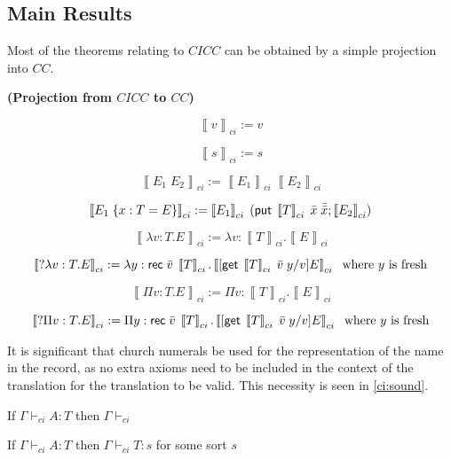 \subsection{Main Results}

Most of the theorems relating to $CICC$ can be obtained by a simple projection into $CC$.

\newcommand{\CICCproj}[1]{ \left\llbracket #1 \right\rrbracket_{ci}}

\begin{definition}
\textbf{ (Projection from $CICC$ to $CC$) }

\[
\CICCproj{v} := v
\]

\[
\CICCproj{s} := s
\]

\[
\CICCproj{E_1 \; E_2} := \CICCproj{E_1} \; \CICCproj{E_2}
\]

\[
\CICCproj{E_1 \; \{ x : T = E \}} := \CICCproj{E_1} \; (\m{put}\;\CICCproj{T}\;\bar{x}\; \bar{\bar{x}}; \CICCproj{E_2} )
\]

\[
\CICCproj{\lambda v : T . E } := \lambda v : \CICCproj{T} . \CICCproj{E}
\]

\[
\CICCproj{?\lambda v : T . E } := \lambda y : \m{rec}\;\bar{v}\; \CICCproj{T} . \CICCproj{ [ \m{get}\; \CICCproj{T}\; \bar{v}\; y  / v ] E}
\;\text{ where $y$ is fresh}
\] 

\[
\CICCproj{\Pi v : T . E } := \Pi v : \CICCproj{T} . \CICCproj{E}
\]

\[
\CICCproj{?\Pi v : T . E } := \Pi y : \m{rec}\;\bar{v}\;\CICCproj{T} . \CICCproj{ [ \m{get}\;\CICCproj{T}\; \bar{v}\; y  / v ] E}
\;\text{ where $y$ is fresh}
\]

\label{cicc:proj}
\end{definition}

It is significant that church numerals be used for the representation of the name in the record, 
as no extra axioms need to be included in the context of the translation for the translation to be valid.  
This necessity is seen in \ref{ci:sound}.

\begin{lemma}

If $\Gamma \vdash_{ci} A : T$ then $\Gamma \vdash_{ci}$

\label{ci:wfctxt}
\end{lemma}

\begin{lemma}

If $\Gamma \vdash_{ci} A : T$ then $\Gamma \vdash_{ci} T : s$ for some sort $s$

\label{ci:wtt}
\end{lemma}

